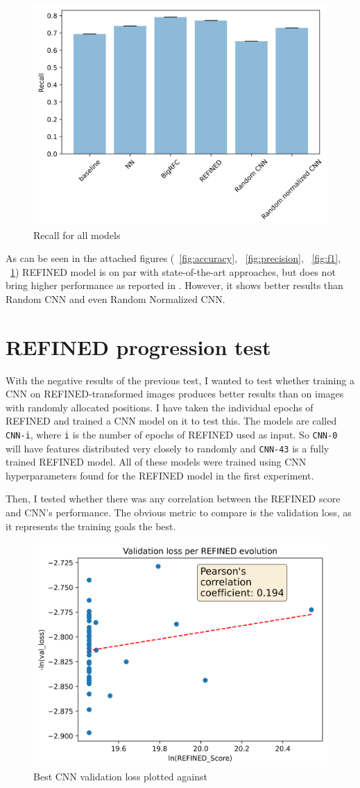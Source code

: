 \begin{figure}
    \centering
    \includegraphics[width=0.5\linewidth]{Recall.png}
    \caption{Recall for all models}
    \label{fig:recall}
\end{figure}

As can be seen in the attached figures (~\ref{fig:accuracy}, ~\ref{fig:precision}, ~\ref{fig:f1}, ~\ref{fig:recall}) REFINED model is on par with state-of-the-art approaches, but does not bring higher performance as reported in \cite{REFINED}. However, it shows better results than Random CNN and even Random Normalized CNN.

\section{REFINED progression test}

With the negative results of the previous test, I wanted to test whether training a CNN on REFINED-transformed images produces better results than on images with randomly allocated positions. I have taken the individual epochs of REFINED and trained a CNN model on it to test this. The models are called \texttt{CNN-i}, where \texttt{i} is the number of epochs of REFINED used as input. So \texttt{CNN-0} will have features distributed very closely to randomly and \texttt{CNN-43} is a fully trained REFINED model. All of these models were trained using CNN hyperparameters found for the REFINED model in the first experiment.

Then, I tested whether there was any correlation between the REFINED score and CNN's performance. The obvious metric to compare is the validation loss, as it represents the training goals the best.

\begin{figure}
    \centering
    \includegraphics[width=0.5\linewidth]{progression.png}
    \caption{Best CNN validation loss plotted against }
    \label{fig:REFINED_progression}
\end{figure}

